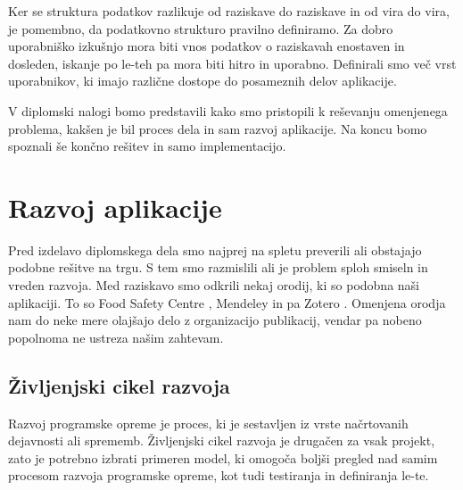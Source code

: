 \documentclass[a4paper, 12pt]{book}
\begin{document}
Ker se struktura podatkov razlikuje od raziskave do raziskave in od vira do vira, je pomembno, da podatkovno strukturo pravilno definiramo. Za dobro uporabniško izkušnjo mora biti vnos podatkov o raziskavah enostaven in dosleden, iskanje po le-teh pa mora biti hitro in uporabno. Definirali smo več vrst uporabnikov, ki imajo različne dostope do posameznih delov aplikacije.

V diplomski nalogi bomo predstavili kako smo pristopili k reševanju omenjenega problema, kakšen je bil proces dela in sam razvoj aplikacije. Na koncu bomo spoznali še končno rešitev in samo implementacijo.






\chapter{Razvoj aplikacije}
\label{pregled-podrocja-chapter}

Pred izdelavo diplomskega dela smo najprej na spletu preverili ali obstajajo podobne rešitve na trgu. S tem smo razmislili ali je problem sploh smiseln in vreden razvoja. Med raziskavo smo odkrili nekaj orodij, ki so podobna naši aplikaciji. To so Food Safety Centre \cite{food-safety-centre}, Mendeley \cite{mendeley-manager} in pa Zotero \cite{zotero-manager}. Omenjena orodja nam do neke mere olajšajo delo z organizacijo publikacij, vendar pa nobeno popolnoma ne ustreza našim zahtevam. 


\section{Življenjski cikel razvoja }
Razvoj programske opreme je proces, ki je sestavljen iz vrste načrtovanih dejavnosti ali sprememb. Življenjski cikel razvoja je drugačen za vsak projekt, zato je potrebno izbrati primeren model, ki omogoča boljši pregled nad samim procesom razvoja programske opreme, kot tudi testiranja in definiranja le-te.
\end{document}
